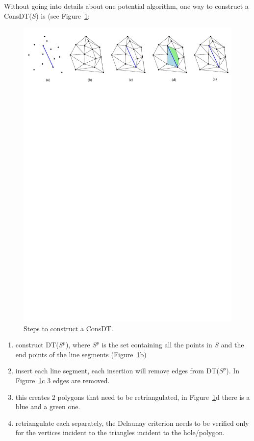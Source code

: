 %

Without going into details about one potential algorithm, one way to construct a ConsDT($S$) is (see Figure~\ref{fig:cdt_steps}:
\begin{figure}
  \centering
  \includegraphics[width=0.95\linewidth]{figs/cdt_steps}
  \caption{Steps to construct a ConsDT.}
\label{fig:cdt_steps}
\end{figure}
\begin{enumerate}
  \item construct DT($S^p$), where $S^p$ is the set containing all the points in $S$ and the end points of the line segments (Figure~\ref{fig:cdt_steps}b)
  \item insert each line segment, each insertion will remove edges from DT($S^p$). In Figure~\ref{fig:cdt_steps}c 3 edges are removed.
  \item this creates 2 polygons that need to be retriangulated, in Figure~\ref{fig:cdt_steps}d there is a blue and a green one.
  \item retriangulate each separately, the Delaunay criterion needs to be verified only for the vertices incident to the triangles incident to the hole/polygon.
\end{enumerate}

